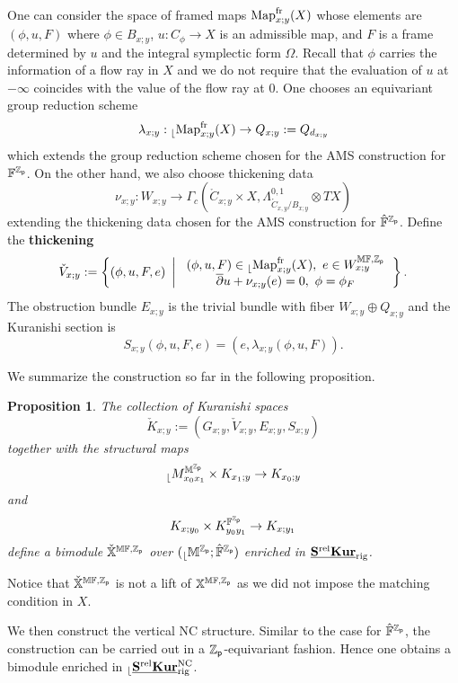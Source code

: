 \documentclass[reqno, 10pt]{amsart}
\numberwithin{equation}{section}
\numberwithin{equation}{section}
\newtheorem{prop}[thm]{Proposition}
\theoremstyle{definition}
\theoremstyle{remark}
\newcommand{\beqn}{\begin{equation*}}
\newcommand{\eeqn}{\end{equation*}}
\newcommand{\ov}{\overline}
\newcommand{\mb}{\mathbb}
\newcommand{\zp}{{{\mb Z}_{\sf p}}}
\renewcommand{\outer}{{}_{\lfloor}}
\newcommand{\uds}[1]{\underline{\smash{#1}}}
\begin{document}
One can consider the space of framed maps ${\rm Map}_{x; y}^{\rm fr}(X)$ whose elements are $(\phi, u, F)$ where $\phi\in B_{x; y}$, $u: C_\phi \to X$ is an admissible map, and $F$ is a frame determined by $u$ and the integral symplectic form $\Omega$. Recall that $\phi$ carries the information of a flow ray in $X$ and we do not require that the evaluation of $u$ at $-\infty$ coincides with the value of the flow ray at $0$. One chooses an equivariant group reduction scheme 
\beqn
\lambda_{x; y} : \outer {\rm Map}_{x;y}^{\rm fr}(X) \to Q_{x;y}:= Q_{d_{x;y}}
\eeqn
which extends the group reduction scheme chosen for the AMS construction for $\mb{F}^\zp$. On the other hand, we also choose thickening data
\beqn
\nu_{x;y}: 
W_{x;y} \to \Gamma_c( \mathring C_{x;y} \times X, \Lambda_{\mathring C_{x,y}/ B_{x;y}}^{0,1} \otimes TX)
\eeqn
extending the thickening data chosen for the AMS construction for $\hat {\mb F}^{\zp}$. Define the {\bf thickening}
\beqn
\check V_{x;y} := \left\{ (\phi, u, F, e)\ \left|\  \begin{array}{c} (\phi, u, F) \in \outer {\rm Map}_{x; y}^{\rm fr}(X),\ e \in W_{x;y}^{\mb{MF}, \zp} \\
\ov\partial u + \nu_{x;y} (e) = 0,\ \phi = \phi_F 
\end{array}\right. \right\}.
\eeqn
The obstruction bundle $E_{x;y} $ is the trivial bundle with fiber $W_{x;y} \oplus Q_{x;y}$ and the Kuranishi section is
\beqn
S_{x;y} (\phi, u, F, e) = (e, \lambda_{x;y}(\phi, u, F)).
\eeqn

We summarize the construction so far in the following proposition.

\begin{prop}\label{prop2110}
The collection of Kuranishi spaces 
\beqn
\check K_{x;y}:= (G_{x;y}, \check V_{x;y}, E_{x;y}, S_{x;y})
\eeqn
together with the structural maps
\beqn
\outer M_{x_0 x_1}^{\mb{M}^\zp} \times K_{x_1; y} \to K_{x_0; y}
\eeqn
and
\beqn
K_{x; y_0} \times K_{y_0 y_1}^{\mb{F}^\zp} \to K_{x; y_1}
\eeqn
define a bimodule $\check {\mb X}^{\mb{MF}, \zp}$ over $(\outer \mb{M}^\zp; \hat{\mb F}^\zp)$ enriched in $\uds{\bf S^{\rm rel} Kur}_{\rm rig}$.
\end{prop}

Notice that $\check{\mb X}^{\mb{MF}, \zp}$ is not a lift of ${\mb X}^{\mb{MF}, \zp}$ as we did not impose the matching condition in $X$.

We then construct the vertical NC structure. Similar to the case for $\hat {\mb F}^{\zp}$, the construction can be carried out in a $\zp$-equivariant fashion. Hence one obtains a bimodule enriched in $\outer \uds{\bf S^{\rm rel} Kur}_{\rm rig}^{\rm NC}$.
\end{document}
